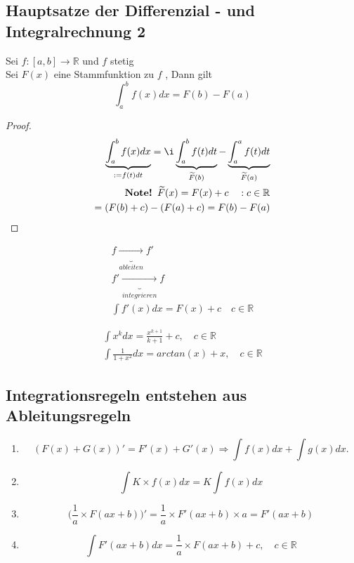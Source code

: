 \subsection{Hauptsatze der Differenzial - und Integralrechnung 2}
Sei $f:[a ,b] \rightarrow \mathbb{R}$ und $f$ stetig\\
Sei $F(x)$ eine Stammfunktion zu $f$ , Dann gilt
\[ \int_{a}^{b} f(x) dx = F(b)-F(a) \]
\begin{proof}
\begin{align*}
\underbrace{\int_{a}^{b} f(x)dx}_{:= f(t)dt} = \i\underbrace{\int_{a}^{b} f(t)dt}_{\widetilde{F}(b)} - \underbrace{\int_{a}^{a} f(t)dt}_{\widetilde{F}(a)}\\
\textbf{ Note! }\widetilde{F}(x) = F(x) + c \quad: c \in \mathbb{R}\\
 = (F(b)+c) - (F(a)+c) = F(b)- F(a)
\end{align*}
\end{proof}
\begin{remark}
\begin{gather*}
f \underbrace{\longrightarrow}_{ableiten} f'\\
f' \underbrace{\longrightarrow}_{integrieren} f \\
\int {f'(x)dx} = F(x) + c  \quad c \in \mathbb{R}
\end{gather*}
\begin{example}
\begin{gather*}
\int{x^k dx} = \frac{x^{k+1} }{ k+1 } + c , \quad c \in \mathbb{R}\\
\int{\frac{1}{1+x^2}dx} = arctan(x) + x , \quad c \in \mathbb{R}
\end{gather*}
\end{example}
\end{remark}
\subsection{Integrationsregeln entstehen aus Ableitungsregeln}
\begin{enumerate}
\item \[(F(x) + G(x))' = F'(x) + G'(x) \Rightarrow \int f(x)dx + \int g(x)dx. \] 
\item \[\int K \times f(x)dx = K \int f(x)dx \]
\item \[\bigg( \frac{1}{a} \times F(ax+b)\bigg)'=\frac{1}{a} \times F'(ax+b)\times a = F'(ax+b)\]
\item \[ \int F' (ax+b) dx = \frac{1}{a} \times F(ax+b)+ c , \quad c \in \mathbb{R} \]
\end{enumerate}